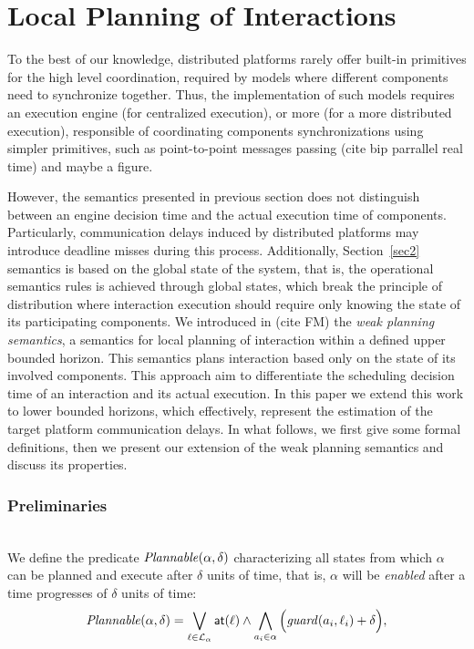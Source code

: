 \section{Local Planning of Interactions}
\label{sec3}
To the best of our knowledge, distributed platforms rarely offer built-in primitives
for the high level coordination, required by models where different components
need to synchronize together. Thus, the implementation of such models requires
an execution engine (for centralized execution), or more (for a more distributed execution),
responsible of coordinating components synchronizations using simpler primitives,
such as point-to-point messages passing (cite bip parrallel real time) and maybe a figure.

However, the semantics presented in previous section does not distinguish between 
an engine decision time and the actual execution time of components.
Particularly, communication delays induced by distributed platforms may introduce 
deadline misses during this process.
Additionally, Section~\ref{sec2} semantics is based on the global state of the system,
that is, the operational semantics rules is achieved through global states, which
break the principle of distribution where interaction execution should require only 
knowing the state of its participating components. 
We introduced in (cite FM) the \emph{weak planning semantics}, a semantics for local
planning of interaction within a defined upper bounded horizon. This semantics plans interaction based only on
the state of its involved components. This approach aim to differentiate the scheduling decision 
time of an interaction and its actual execution. In this paper we extend this work to lower bounded
horizons, which effectively, represent the estimation of the target platform communication
delays. In what follows, we first give some formal definitions, then we present our extension of
the weak planning semantics and discuss its properties.

\subsubsection*{Preliminaries}\label{subsec:wp}\mbox{}\\ 
We define the predicate $\mathit{Plannable(\alpha,\delta)}$ characterizing all states
  from which $\alpha$ can be planned and execute after $\delta$ units of time, that is, 
  $\alpha$ will be \emph{enabled} after a time progresses of $\delta$ units of time:
  \begin{equation}\label{eq:enf}
    \mathit{Plannable(\alpha,\delta)}=\bigvee_{\ell\in\mathcal{L}_{\alpha}} \textnormal{\textsf{at}}(\ell)\wedge\bigwedge_{a_i\in\alpha} \Big(\mathit{guard}(a_i,\ell_i)+\delta\Big),
\end{equation}


